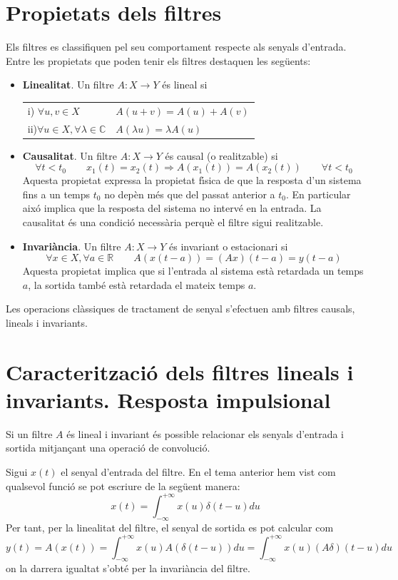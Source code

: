 \documentclass{article}
\def\R{\mathbb R}
\def\C{\mathbb C}
\begin{document}
\section{Propietats dels filtres}
Els filtres es classifiquen pel seu comportament respecte als senyals d'entrada.
Entre les propietats que poden tenir els filtres destaquen les seg\"uents:
\begin{itemize}
\item {\bf Linealitat}. Un filtre $A:X \rightarrow Y$ \'es lineal si
\newline
\newline
\begin{tabular}{ll}
i) $\forall u,v \in X$ & $A(u+v)=A(u)+A(v)$\\
ii)$\forall u \in X, \forall \lambda \in \C$ & $A(\lambda u)=\lambda A(u)$
\end{tabular}
\item {\bf Causalitat}. Un filtre $A:X \rightarrow Y$ \'es causal (o realitzable) si
\[
\forall t < t_0 \qquad x_1(t)=x_2(t) \Longrightarrow A(x_1(t))=A(x_2(t)) \qquad \forall t < t_0
\]
Aquesta propietat expressa la propietat f\'\i sica de que la resposta d'un sistema fins
a un temps $t_0$ no dep\`en m\'es que del passat anterior a $t_0$. En particular aix\'o
implica que la resposta del sistema no interv\'e en la entrada. La causalitat \'es una 
condici\'o necess\`aria perqu\`e el filtre sigui realitzable.
\item {\bf Invari\`ancia}. Un filtre $A:X \rightarrow Y$ \'es invariant o estacionari si
\[
\forall x \in X, \forall a \in \R \qquad A(x(t-a))=(Ax)(t-a)=y(t-a)
\]
Aquesta propietat implica que si l'entrada al sistema est\`a retardada un temps $a$, la sortida 
tamb\'e est\`a retardada el mateix temps $a$.
\end{itemize}

Les operacions cl\`assiques de tractament de senyal s'efectuen amb filtres causals, lineals i 
invariants.  
  
  
\section{Caracteritzaci\'o dels filtres lineals i invariants. Resposta impulsional}
Si un filtre $A$ \'es lineal i invariant \'es possible relacionar els senyals d'entrada
i sortida mitjan\c{c}ant una operaci\'o de convoluci\'o.

Sigui $x(t)$ el senyal d'entrada del filtre. En el tema anterior hem vist com qualsevol
funci\'o se pot escriure de la seg\"uent manera:
\[ 
x(t)=\int_{-\infty}^{+\infty} x(u) \delta(t-u) du 
\]
Per tant, per la linealitat del filtre, el senyal de sortida es pot calcular com
\[ 
y(t)=A(x(t))=\int_{-\infty}^{+\infty} x(u) A(\delta(t-u)) du =
\int_{-\infty}^{+\infty} x(u) (A\delta)(t-u) du 
\]
\noindent
on la darrera igualtat s'obt\'e per la invari\`ancia del filtre.
\end{document}
